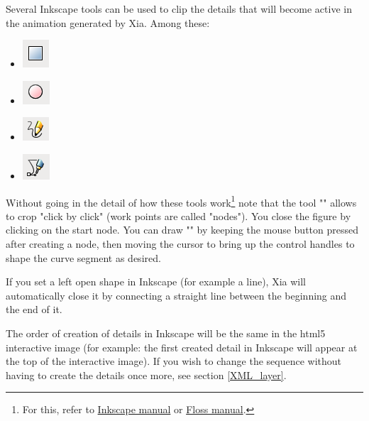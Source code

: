 Several Inkscape tools can be used to clip the details that
will become active in the animation generated by Xia. Among these:
\begin{itemize}
 \item \includegraphics[scale=0.5]{./images/square} 
 \item \includegraphics[scale=0.5]{./images/circles} 
 \item \includegraphics[scale=0.5]{./images/line} 
 \item \includegraphics[scale=0.5]{./images/bezier} 
\end{itemize}

Without going in the detail of how these tools work\footnote{For this, 
refer to \href{http://inkscape.org/doc/shapes/tutorial-shapes.fr.html}{Inkscape manual} or \href{http://en.flossmanuals.net/inkscape/}{Floss manual}.} note that the tool "" 
allows to crop "click by click" (work points are called 
"nodes").  You close the figure by clicking on the start node. 
You can draw "" by keeping the mouse button pressed 
after creating a node, then moving the cursor to bring up the control handles 
to shape the curve segment as desired.


\begin{alert}
  If you set a left open shape in Inkscape (for example a line), Xia will automatically close it  by connecting a straight line between the beginning and the end of it.
\end{alert}

\begin{alert}
 The order of creation of details in Inkscape will be 
 the same in the html5 interactive image (for example: the first created detail in
Inkscape will appear at the top of the interactive image).
If you wish to change the sequence without having to create the details once more, see 
section \ref{XML_layer}.
\end{alert}

